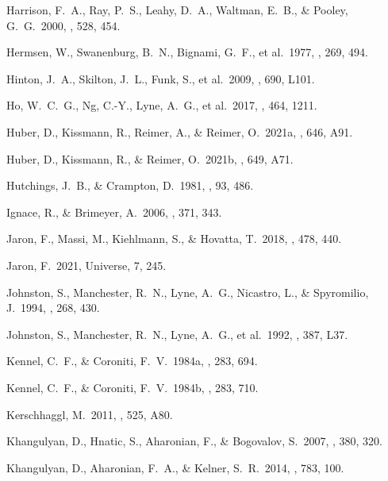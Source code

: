 \documentclass{aa}
\begin{document}
\begin{thebibliography}{}
 Harrison, F.~A., Ray, P.~S., Leahy, D.~A., Waltman, E.~B., \& Pooley, G.~G.\ 2000, \apj, 528, 454.

 Hermsen, W., Swanenburg, B.~N., Bignami, G.~F., et al.\ 1977, \nat, 269, 494.

 Hinton, J.~A., Skilton, J.~L., Funk, S., et al.\ 2009, \apjl, 690, L101.

 Ho, W.~C.~G., Ng, C.-Y., Lyne, A.~G., et al.\ 2017, \mnras, 464, 1211.

 Huber, D., Kissmann, R., Reimer, A., \& Reimer, O.\ 2021a, \aap, 646, A91.

 Huber, D., Kissmann, R., \& Reimer, O.\ 2021b, \aap, 649, A71.

 Hutchings, J.~B., \& Crampton, D.\ 1981, \pasp, 93, 486.

 Ignace, R., \& Brimeyer, A.\ 2006, \mnras, 371, 343.

 Jaron, F., Massi, M., Kiehlmann, S., \& Hovatta, T.\ 2018, \mnras, 478, 440.

 Jaron, F.\ 2021, Universe, 7, 245.

 Johnston, S., Manchester, R.~N., Lyne, A.~G., Nicastro, L., \& Spyromilio, J.\ 1994, \mnras, 268, 430.

 Johnston, S., Manchester, R.~N., Lyne, A.~G., et al.\ 1992, \apjl, 387, L37.

 Kennel, C.~F., \& Coroniti, F.~V.\ 1984a, \apj, 283, 694.

 Kennel, C.~F., \& Coroniti, F.~V.\ 1984b, \apj, 283, 710.

 Kerschhaggl, M.\ 2011, \aap, 525, A80.

 Khangulyan, D., Hnatic, S., Aharonian, F., \& Bogovalov, S.\ 2007, \mnras, 380, 320.

 Khangulyan, D., Aharonian, F.~A., \& Kelner, S.~R.\ 2014, \apj, 783, 100.


\end{thebibliography}
\end{document}
